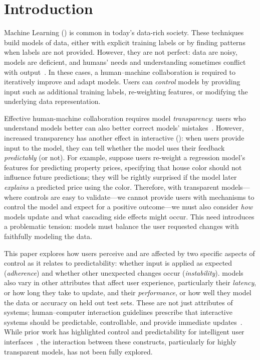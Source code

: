 \section{Introduction}

Machine Learning () is common in today's data-rich society.
These techniques build models of data, either with explicit training
labels or by finding patterns when labels are not provided.
However, they are not perfect: data are noisy, models are
deficient, and humans' needs and understanding sometimes conflict with
 output~\cite{amodei2016concrete}.
In these cases, a human--machine collaboration is required to iteratively improve and adapt models.
Users can \textit{control} models by providing input such as additional training labels, re-weighting features, or modifying the underlying data representation.


Effective human-machine collaboration requires model
\textit{transparency}: users who understand models better can also
better correct models'
mistakes~\cite{Kulesza2010ExplanatoryPrograms,
  Rosenthal2010TowardsData}.
However, increased transparency has another effect in interactive 
(): when users provide input to the model, they can tell whether the model uses their feedback
\textit{predictably} (or not).
For example, suppose users re-weight a regression model's features
for predicting property prices, specifying that house color should
not influence future predictions; they will be rightly
surprised if the model later \textit{explains} a predicted price using
the color.
Therefore, with transparent models---where controls are easy to validate---we cannot  provide
users with mechanisms to control the model and expect for a positive
outcome---we must also consider \textit{how} models update and what
cascading side effects might occur. This need introduces a problematic
tension:
 models must balance the user requested changes with faithfully modeling
 the data.

This paper explores how users perceive and are affected by two specific aspects of control as it relates to predictability: whether input is applied as expected (\textit{adherence}) and whether other unexpected changes occur (\textit{instability}).  models also vary in other attributes that affect user experience, particularly their \textit{latency}, or how long they take to update, and their \textit{performance}, or how well they model the data or accuracy on held out test sets. These are not just attributes of  systems; human--computer interaction guidelines prescribe that interactive systems should be predictable, controllable, and provide immediate updates~\cite{Hoekman2007DesigningDesign, Shneiderman1996TheVisualizations}. While prior work has highlighted control and predictability for intelligent user interfaces~\cite{Hook2000StepsReal}, the interaction between these constructs, particularly for highly transparent models, has not been fully explored.

